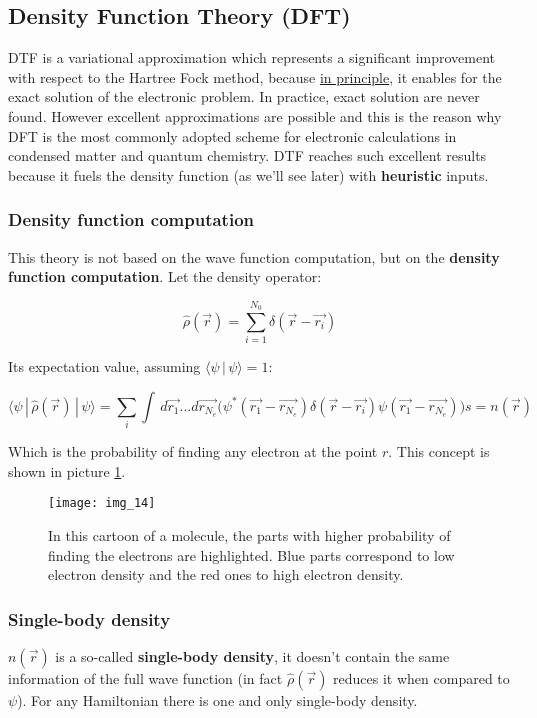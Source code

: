 	\subsection{Density Function Theory (DFT)}
	DTF is a variational approximation which represents a significant improvement with respect to the Hartree Fock method, because \underline{in principle}, it enables for the exact solution of the electronic problem.
	In practice, exact solution are never found.
	However excellent approximations are possible and this is the reason why DFT is the most commonly adopted scheme for electronic calculations in condensed matter and quantum chemistry.
	DTF reaches such excellent results because it fuels the density function (as we'll see later) with \textbf{heuristic} inputs.

		\subsubsection{Density function computation}
		This theory is not based on the wave function computation, but on the \textbf{density function computation}.
		Let the density operator:

		$$\hat{\rho}(\vec{r})=\sum_{i=1}^{N_0}\delta(\vec{r}-\vec{r_i})$$

		Its expectation value, assuming $\langle \psi\,|\,\psi \rangle =1$:

		$$\langle \psi\,|\,\hat{\rho}(\vec{r})\,|\,\psi \rangle=\sum_i \int\,d\vec{r_1}...d\vec{r_{N_e}}\bigg(\psi^*(\vec{r_1}-\vec{r_{N_e}})\delta(\vec{r}-\vec{r_i})\psi(\vec{r_1}-\vec{r_{N_e}})\bigg)s=n(\vec{r})$$

		Which is the probability of finding any electron at the point $r$.
		This concept is shown in picture \ref{molecule}.

		\begin{figure}[htbp!]
			\centering
			\texttt{[image: img\_14]}
			\caption{In this cartoon of a molecule, the parts with higher probability of finding the electrons are highlighted. Blue parts correspond to low electron density and the red ones to high electron density.}
			\label{molecule}
		\end{figure}

		\subsubsection{Single-body density}
		$n(\vec{r})$ is a so-called \textbf{single-body density}, it doesn't contain the same information of the full wave function (in fact $\hat{\rho}(\vec{r})$ reduces it when compared to $\psi$).
		For any Hamiltonian there is one and only single-body density.\\

